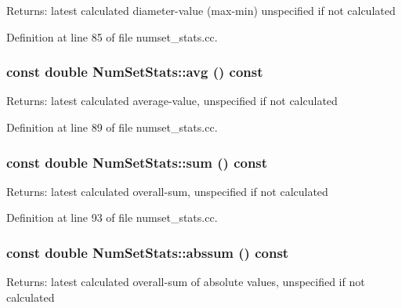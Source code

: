 \begin{Desc}
\item[Returns:]latest calculated diameter-value (max-min) unspecified if not calculated \end{Desc}


Definition at line 85 of file numset\_\-stats.cc.\hypertarget{class_num_set_stats_c89ea68555e034fc8ad61a24e8105bbc}{
\subsubsection[avg]{\setlength{\rightskip}{0pt plus 5cm}const double NumSetStats::avg () const}}
\label{class_num_set_stats_c89ea68555e034fc8ad61a24e8105bbc}


\begin{Desc}
\item[Returns:]latest calculated average-value, unspecified if not calculated \end{Desc}


Definition at line 89 of file numset\_\-stats.cc.\hypertarget{class_num_set_stats_8576d0ce14fa99580e6f78666c841637}{
\subsubsection[sum]{\setlength{\rightskip}{0pt plus 5cm}const double NumSetStats::sum () const}}
\label{class_num_set_stats_8576d0ce14fa99580e6f78666c841637}


\begin{Desc}
\item[Returns:]latest calculated overall-sum, unspecified if not calculated \end{Desc}


Definition at line 93 of file numset\_\-stats.cc.\hypertarget{class_num_set_stats_09c585c3187b3355b9c4e4f20bdef394}{
\subsubsection[abssum]{\setlength{\rightskip}{0pt plus 5cm}const double NumSetStats::abssum () const}}
\label{class_num_set_stats_09c585c3187b3355b9c4e4f20bdef394}


\begin{Desc}
\item[Returns:]latest calculated overall-sum of absolute values, unspecified if not calculated \end{Desc}


